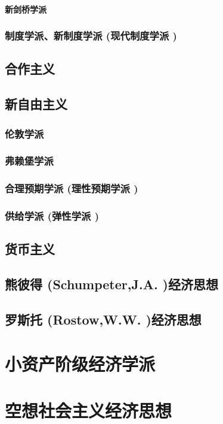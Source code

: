 \documentclass[UTF8]{../../RepresentationUniverse}
\begin{document}
            \paragraph{新剑桥学派}
        \subsubsection{制度学派、新制度学派 (现代制度学派 )}
    \subsection{合作主义}
    \subsection{新自由主义}
        \subsubsection{伦敦学派}
        \subsubsection{弗赖堡学派}
        \subsubsection{合理预期学派 (理性预期学派 )}
        \subsubsection{供给学派 (弹性学派 )}
    \subsection{货币主义}
    \subsection{熊彼得 (Schumpeter,J.A. )经济思想}
    \subsection{罗斯托 (Rostow,W.W. )经济思想}

\section{小资产阶级经济学派}
\section{空想社会主义经济思想}
\end{document}
